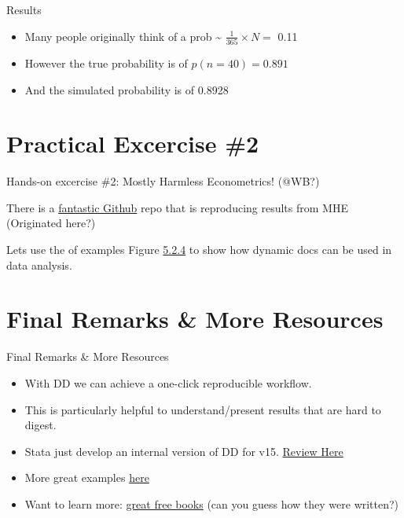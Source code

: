 \begin{frame}{Results}

\begin{itemize}
\tightlist
\item
  Many people originally think of a prob \textasciitilde{}
  \(\frac{1}{365} \times N =\) 0.11
\item
  However the true probability is of \(p(n= 40) = 0.891\)
\item
  And the simulated probability is of 0.8928
\end{itemize}

\end{frame}

\section{Practical Excercise \#2}\label{practical-excercise-2}

\begin{frame}{Hands-on excercise \#2: Mostly Harmless Econometrics!
(@WB?)}

There is a
\href{https://github.com/vikjam/mostly-harmless-replication}{fantastic
Github} repo that is reproducing results from MHE (Originated here?)

Lets use the of examples Figure
\href{https://github.com/vikjam/mostly-harmless-replication/blob/master/05\%20Fixed\%20Effects\%2C\%20DD\%20and\%20Panel\%20Data/Figure\%205-2-4.r}{5.2.4}
to show how dynamic docs can be used in data analysis.

\end{frame}

\section{Final Remarks \& More
Resources}\label{final-remarks-more-resources}

\begin{frame}{Final Remarks \& More Resources}

\begin{itemize}
\tightlist
\item
  With DD we can achieve a one-click reproducible workflow.
\item
  This is particularly helpful to understand/present results that are
  hard to digest.
\item
  Stata just develop an internal version of DD for v15.
  \href{https://www.bitss.org/2017/09/05/review-of-statas-dyndoc/}{Review
  Here}
\item
  More great examples
  \href{https://github.com/BITSS/Annual2017/tree/master/3-Rmarkdown}{here}
\item
  Want to learn more: \href{https://bookdown.org/}{great free books}
  (can you guess how they were written?)
\end{itemize}

\end{frame}
